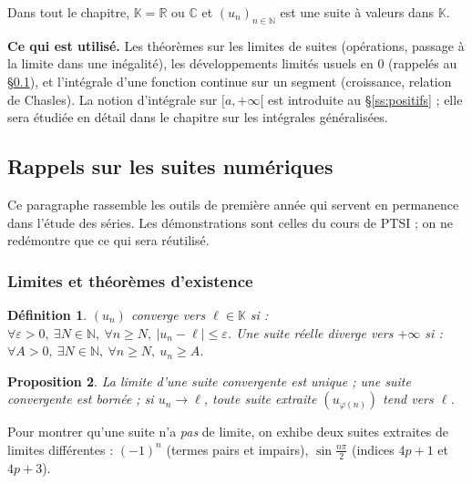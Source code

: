 \documentclass[a4paper,11pt]{article}
\numberwithin{equation}{section}
\numberwithin{figure}{section}
\numberwithin{table}{section}
\theoremstyle{enonce}
\newtheorem{definition}{Définition}[section]
\newtheorem{proposition}[definition]{Proposition}
\theoremstyle{exemple}
\theoremstyle{remarque}
\newcommand{\K}{\mathbb{K}}
\newcommand{\R}{\mathbb{R}}
\newcommand{\C}{\mathbb{C}}
\newcommand{\N}{\mathbb{N}}
\begin{document}
Dans tout le chapitre, $\K=\R$ ou $\C$ et $(u_n)_{n\in\N}$ est une suite à valeurs dans $\K$.

\begin{commencer}
\textbf{Ce qui est utilisé.} Les théorèmes sur les limites de suites (opérations, passage à la limite dans une inégalité),
les développements limités usuels en $0$ (rappelés au §\ref{ss:suites}), et l'intégrale d'une fonction continue sur un segment
(croissance, relation de Chasles). La notion d'intégrale sur $[a,+\infty[$ est introduite au §\ref{ss:positifs} ; elle sera
étudiée en détail dans le chapitre sur les intégrales généralisées.
\end{commencer}

\subsection{Rappels sur les suites numériques}\label{ss:suites}

Ce paragraphe rassemble les outils de première année qui servent en permanence dans l'étude des séries. Les démonstrations
sont celles du cours de PTSI ; on ne redémontre que ce qui sera réutilisé.

\subsubsection*{Limites et théorèmes d'existence}

\begin{definition}
$(u_n)$ \emph{converge} vers $\ell\in\K$ si : $\forall\varepsilon>0,\ \exists N\in\N,\ \forall n\geq N,\ |u_n-\ell|\leq\varepsilon$.
Une suite réelle \emph{diverge vers $+\infty$} si : $\forall A>0,\ \exists N\in\N,\ \forall n\geq N,\ u_n\geq A$.
\end{definition}

\begin{proposition}
La limite d'une suite convergente est unique ; une suite convergente est bornée ; si $u_n\to\ell$, toute suite extraite
$(u_{\varphi(n)})$ tend vers $\ell$.
\end{proposition}

\begin{enpratique}
Pour montrer qu'une suite n'a \emph{pas} de limite, on exhibe deux suites extraites de limites différentes : $(-1)^n$ (termes
pairs et impairs), $\sin\frac{n\pi}2$ (indices $4p+1$ et $4p+3$).
\end{enpratique}
\end{document}
